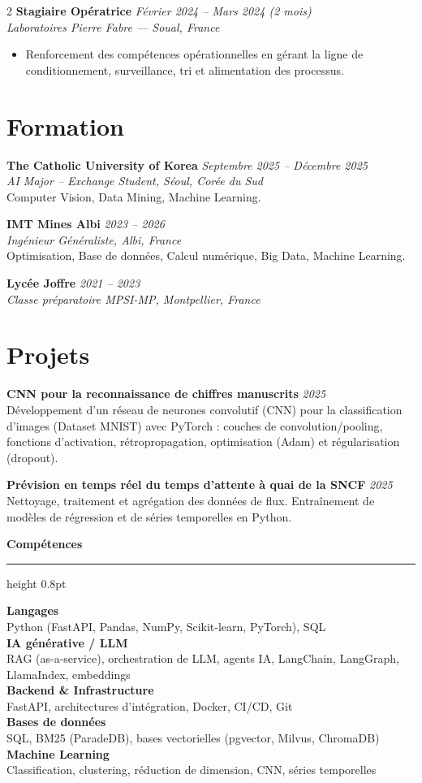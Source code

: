 \documentclass[10.5pt,a4paper]{article}
\newcommand{\sectionrule}{\vspace{-6pt}{\color{accent}\hrule height 1pt}\vspace{2pt}}
\newcommand{\subsectitle}[1]{%
  {\color{accent}\bfseries\large #1}\\[-2pt]
  {\color{accent}\hrule height 0.8pt}\vspace{4pt}
}
\newcommand{\cvexp}[5]{%
  \noindent\textbf{#1} \hfill {\itshape\color{graytext}\small #4}\\
  {\itshape #2 --- #3}\\[-2pt]
  #5
  \vspace{5pt}
}
\newcommand{\cvedu}[5]{%
  \noindent\textbf{#1} \hfill {\itshape\color{graytext}\small #4}\\
  {\itshape #2, #3}\\[1pt]
  {\small #5}
  \vspace{2pt}
}
\newcommand{\cveduplain}[4]{%
  \noindent\textbf{#1} \hfill {\itshape\color{graytext}\small #4}\\
  {\itshape #2, #3}
  \vspace{2pt}
}
\newcommand{\cvproject}[3]{%
  \noindent\textbf{#1} \hfill {\itshape\color{graytext}\small #2}\\[1pt]
  {\small #3}
  \vspace{2pt}
}
\newcommand{\sidebarline}[2]{%
  \noindent\textbf{\small #1}\\
  {\small #2}\\[3pt]
}
\begin{document}
\begin{paracol}{2}
\cvexp{Stagiaire Opératrice}{Laboratoires Pierre Fabre}{Soual, France}{Février 2024 -- Mars 2024 (2 mois)}{%
  \begin{itemize}[leftmargin=12pt, itemsep=2pt, topsep=0pt, partopsep=0pt, parsep=0pt]
    \item Renforcement des compétences opérationnelles en gérant la ligne de conditionnement, surveillance, tri et alimentation des processus.
  \end{itemize}
}

\section*{Formation}
\sectionrule

\cvedu{The Catholic University of Korea}{AI Major -- Exchange Student}{Séoul, Corée du Sud}{Septembre 2025 -- Décembre 2025}{Computer Vision, Data Mining, Machine Learning.}

\cvedu{IMT Mines Albi}{Ingénieur Généraliste}{Albi, France}{2023 -- 2026}{Optimisation, Base de données, Calcul numérique, Big Data, Machine Learning.}

\cveduplain{Lycée Joffre}{Classe préparatoire MPSI-MP}{Montpellier, France}{2021 -- 2023}

\section*{Projets}
\sectionrule

\cvproject{CNN pour la reconnaissance de chiffres manuscrits}{2025}{Développement d'un réseau de neurones convolutif (CNN) pour la classification d'images (Dataset MNIST) avec PyTorch : couches de convolution/pooling, fonctions d'activation, rétropropagation, optimisation (Adam) et régularisation (dropout).}

\cvproject{Prévision en temps réel du temps d'attente à quai de la SNCF}{2025}{Nettoyage, traitement et agrégation des données de flux. Entraînement de modèles de régression et de séries temporelles en Python.}

\switchcolumn

\vspace{2pt}

\subsectitle{Compétences}

\sidebarline{Langages}{Python (FastAPI, Pandas, NumPy, Scikit-learn, PyTorch), SQL}
\sidebarline{IA générative / LLM}{RAG (as-a-service), orchestration de LLM, agents IA, LangChain, LangGraph, LlamaIndex, embeddings}
\sidebarline{Backend \& Infrastructure}{FastAPI, architectures d'intégration, Docker, CI/CD, Git}
\sidebarline{Bases de données}{SQL, BM25 (ParadeDB), bases vectorielles (pgvector, Milvus, ChromaDB)}
\sidebarline{Machine Learning}{Classification, clustering, réduction de dimension, CNN, séries temporelles}


\end{paracol}
\end{document}
